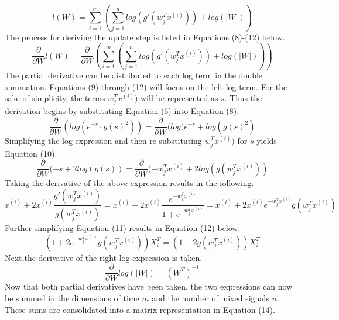 \documentclass[12pt]{article}
\begin{document}
\begin{equation}
    l(W)=\sum_{i=1}^{m}(\sum_{j=1}^{n} log(g'(w_{j}^{T}x^{(i)}))+log(\left | W \right |))
\end{equation}
\bigbreak
\noindent
The process for deriving the update step is listed in Equations (8)-(12) below.
\begin{equation}
    \frac{\partial}{\partial W} l(W)= \frac{\partial}{\partial W}(\sum_{i=1}^{m}(\sum_{j=1}^{n} log(g'(w_{j}^{T}x^{(i)}))+log(\left | W \right |)))
\end{equation}
\bigbreak
\noindent
The partial derivative can be distributed to each log term in the double summation. Equations (9) through (12) will focus on the left log term. For the sake of simplicity, the terms \(w_{j}^{T}x^{(i)})\) will be represented as \(s\). Thus the derivation begins by substituting Equation (6) into Equation (8).
\begin{equation}
    \frac{\partial}{\partial W}(log(e^{-s}\cdot g(s)^{2})) = \frac{\partial}{\partial W}(log(e^{-s}+log(g(s)^{2})
\end{equation}
Simplifying the log expression and then re substituting \(w_{j}^{T}x^{(i)})\) for \(s\) yields Equation (10).
\begin{equation}
    \frac{\partial}{\partial W}(-s+2log(g(s)) = \frac{\partial}{\partial W}(-w_{j}^{T}x^{(i)}+2log(g(w_{j}^{T}x^{(i)}))
\end{equation}
Taking the derivative of the above expression results in the following.
\begin{equation}
    x^{(i)}+2x^{(i)}\frac{g'(w_{j}^{T}x^{(i)})}{g(w_{j}^{T}x^{(i)})}=x^{(i)}+2x^{(i)}\frac{e^{-w_{j}^{T}x^{(i)}}}{1+e^{-w_{j}^{T}x^{(i)}}}=x^{(i)}+2x^{(i)}e^{-w_{j}^{T}x^{(i)}}g(w_{j}^{T}x^{(i)})
\end{equation}
\bigbreak
\noindent
Further simplifying Equation (11) results in Equation (12) below.
\begin{equation}
    (1+2e^{-w_{j}^{T}x^{(i)}}g(w_{j}^{T}x^{(i)}))X_{i}^{T}=(1-2g(w_{j}^{T}x^{(i)}))X_{i}^{T}
\end{equation}
\bigbreak
\noindent
Next,the derivative of the right log expression is taken.
\begin{equation}
    \frac{\partial}{\partial W} log(\left | W \right |) = (W^{T})^{-1}
\end{equation}
\bigbreak
\noindent
Now that both partial derivatives have been taken, the two expressions can now be summed in the dimensions of time \(m\) and the number of mixed signals \(n\). These sums are consolidated into a matrix representation in Equation (14).
\end{document}
